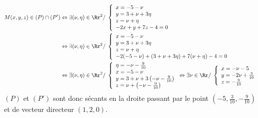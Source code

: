 {{\begin{align*}\ensuremath
M(x,y,z)\in(P)\cap(P')&\Leftrightarrow\exists(\nu,\eta)\in\Rr^2/\;\left\{
\begin{array}{l}
x=-5-\nu\\
y=3+\nu+3\eta\\
z=\nu+\eta\\
-2x+y+7z-4=0
\end{array}
\right.\\
 &\Leftrightarrow\exists(\nu,\eta)\in\Rr^2/\;\left\{
\begin{array}{l}
x=-5-\nu\\
y=3+\nu+3\eta\\
z=\nu+\eta\\
-2(-5-\nu)+(3+\nu+3\eta)+7(\nu+\eta)-4=0
\end{array}
\right.\\
 &\Leftrightarrow\exists(\nu,\eta)\in\Rr^2/\;\left\{
\begin{array}{l}
\eta=-\nu-\frac{9}{10}\\
x=-5-\nu\\
y=3+\nu+3\left(-\nu-\frac{9}{10}\right)\\
z=\nu+\left(-\nu-\frac{9}{10}\right)
\end{array}
\right.
\Leftrightarrow
\exists\nu\in\Rr/\;
\left\{
\begin{array}{l}
x=-\nu-5\\
y=-2\nu+\frac{3}{10}\\
z=-\frac{9}{10}
\end{array}
\right.
\end{align*}
$(P)$ et $(P')$ sont donc sécants en la droite passant par le point $\left(-5,\frac{3}{10},-\frac{9}{10}\right)$ et de vecteur directeur $(1,2,0)$.
}
}
